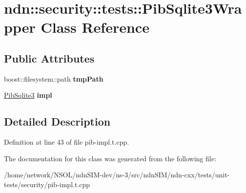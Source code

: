 \hypertarget{classndn_1_1security_1_1tests_1_1PibSqlite3Wrapper}{}\section{ndn\+:\+:security\+:\+:tests\+:\+:Pib\+Sqlite3\+Wrapper Class Reference}
\label{classndn_1_1security_1_1tests_1_1PibSqlite3Wrapper}
\subsection*{Public Attributes}
\begin{DoxyCompactItemize}
\item 
boost\+::filesystem\+::path {\bfseries tmp\+Path}\hypertarget{classndn_1_1security_1_1tests_1_1PibSqlite3Wrapper_a0494ac0f45067495df2621e4359d023f}{}\label{classndn_1_1security_1_1tests_1_1PibSqlite3Wrapper_a0494ac0f45067495df2621e4359d023f}

\item 
\hyperlink{classndn_1_1security_1_1PibSqlite3}{Pib\+Sqlite3} {\bfseries impl}\hypertarget{classndn_1_1security_1_1tests_1_1PibSqlite3Wrapper_a014fad02a42ac80562cf64a73181979f}{}\label{classndn_1_1security_1_1tests_1_1PibSqlite3Wrapper_a014fad02a42ac80562cf64a73181979f}

\end{DoxyCompactItemize}


\subsection{Detailed Description}


Definition at line 43 of file pib-\/impl.\+t.\+cpp.



The documentation for this class was generated from the following file\+:\begin{DoxyCompactItemize}
\item 
/home/network/\+N\+S\+O\+L/ndn\+S\+I\+M-\/dev/ns-\/3/src/ndn\+S\+I\+M/ndn-\/cxx/tests/unit-\/tests/security/pib-\/impl.\+t.\+cpp\end{DoxyCompactItemize}
